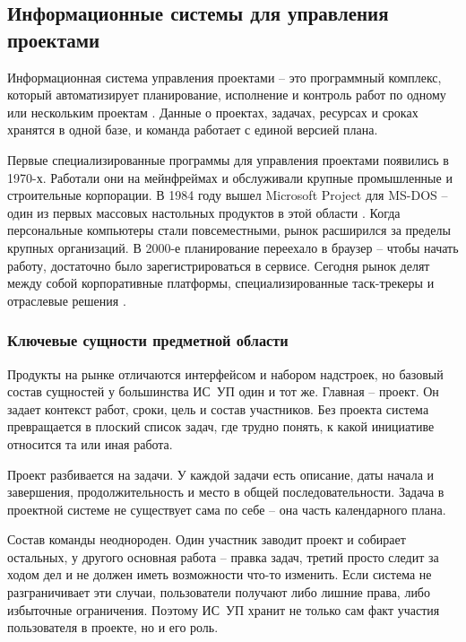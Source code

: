 \subsection{Информационные системы для управления проектами}

Информационная система управления проектами -- это программный комплекс, который автоматизирует планирование, исполнение и контроль работ по одному или нескольким проектам \cite{safonova_is}. Данные о проектах, задачах, ресурсах и сроках хранятся в одной базе, и команда работает с единой версией плана.

Первые специализированные программы для управления проектами появились в 1970-х. Работали они на мейнфреймах и обслуживали крупные промышленные и строительные корпорации. В 1984 году вышел Microsoft Project для MS-DOS -- один из первых массовых настольных продуктов в этой области \cite{akhmadullin_pms}. Когда персональные компьютеры стали повсеместными, рынок расширился за пределы крупных организаций. В 2000-е планирование переехало в браузер -- чтобы начать работу, достаточно было зарегистрироваться в сервисе. Сегодня рынок делят между собой корпоративные платформы, специализированные таск-трекеры и отраслевые решения \cite{akhmadullin_pms}.

\subsubsection{Ключевые сущности предметной области}

Продукты на рынке отличаются интерфейсом и набором надстроек, но базовый состав сущностей у большинства ИС~УП один и тот же. Главная -- проект. Он задает контекст работ, сроки, цель и состав участников. Без проекта система превращается в плоский список задач, где трудно понять, к какой инициативе относится та или иная работа.

Проект разбивается на задачи. У каждой задачи есть описание, даты начала и завершения, продолжительность и место в общей последовательности. Задача в проектной системе не существует сама по себе -- она часть календарного плана.

Состав команды неоднороден. Один участник заводит проект и собирает остальных, у другого основная работа -- правка задач, третий просто следит за ходом дел и не должен иметь возможности что-то изменить. Если система не разграничивает эти случаи, пользователи получают либо лишние права, либо избыточные ограничения. Поэтому ИС~УП хранит не только сам факт участия пользователя в проекте, но и его роль.

